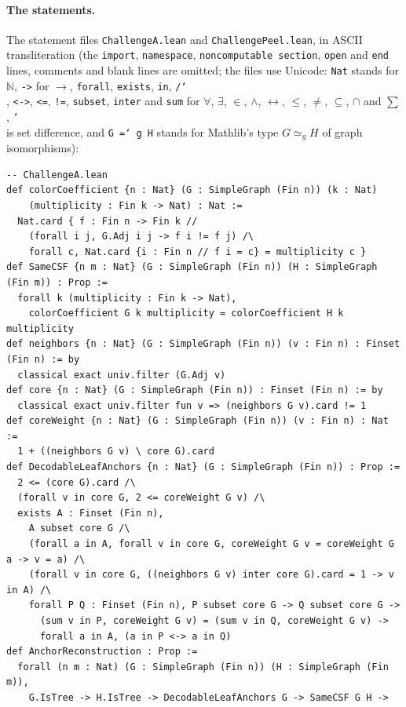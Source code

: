 \documentclass[11pt]{article}
\theoremstyle{definition}
\theoremstyle{remark}
\newcommand{\N}{\mathbb N}
\begin{document}
{\paragraph{The statements.} The statement files \texttt{ChallengeA.lean} and
\texttt{ChallengePeel.lean}, in ASCII transliteration (the \texttt{import},
\texttt{namespace}, \texttt{noncomputable section}, \texttt{open} and
\texttt{end} lines, comments and blank lines are omitted; the files use Unicode:
\texttt{Nat} stands for $\N$, \texttt{->} for $\to$, \texttt{forall},
\texttt{exists}, \texttt{in}, \texttt{/\char`\\}, \texttt{<->}, \texttt{<=},
\texttt{!=}, \texttt{subset}, \texttt{inter} and \texttt{sum} for $\forall$,
$\exists$, $\in$, $\wedge$, $\leftrightarrow$, $\le$, $\ne$, $\subseteq$, $\cap$
and $\sum$, \texttt{\char`\\} is set difference, and \texttt{G =\char`~g H}
stands for Mathlib's type $G\simeq_g H$ of graph isomorphisms):
{\footnotesize
\begin{verbatim}
-- ChallengeA.lean
def colorCoefficient {n : Nat} (G : SimpleGraph (Fin n)) (k : Nat)
    (multiplicity : Fin k -> Nat) : Nat :=
  Nat.card { f : Fin n -> Fin k //
    (forall i j, G.Adj i j -> f i != f j) /\
    forall c, Nat.card {i : Fin n // f i = c} = multiplicity c }
def SameCSF {n m : Nat} (G : SimpleGraph (Fin n)) (H : SimpleGraph (Fin m)) : Prop :=
  forall k (multiplicity : Fin k -> Nat),
    colorCoefficient G k multiplicity = colorCoefficient H k multiplicity
def neighbors {n : Nat} (G : SimpleGraph (Fin n)) (v : Fin n) : Finset (Fin n) := by
  classical exact univ.filter (G.Adj v)
def core {n : Nat} (G : SimpleGraph (Fin n)) : Finset (Fin n) := by
  classical exact univ.filter fun v => (neighbors G v).card != 1
def coreWeight {n : Nat} (G : SimpleGraph (Fin n)) (v : Fin n) : Nat :=
  1 + ((neighbors G v) \ core G).card
def DecodableLeafAnchors {n : Nat} (G : SimpleGraph (Fin n)) : Prop :=
  2 <= (core G).card /\
  (forall v in core G, 2 <= coreWeight G v) /\
  exists A : Finset (Fin n),
    A subset core G /\
    (forall a in A, forall v in core G, coreWeight G v = coreWeight G a -> v = a) /\
    (forall v in core G, ((neighbors G v) inter core G).card = 1 -> v in A) /\
    forall P Q : Finset (Fin n), P subset core G -> Q subset core G ->
      (sum v in P, coreWeight G v) = (sum v in Q, coreWeight G v) ->
      forall a in A, (a in P <-> a in Q)
def AnchorReconstruction : Prop :=
  forall (n m : Nat) (G : SimpleGraph (Fin n)) (H : SimpleGraph (Fin m)),
    G.IsTree -> H.IsTree -> DecodableLeafAnchors G -> SameCSF G H ->

\end{verbatim}}}
\end{document}
